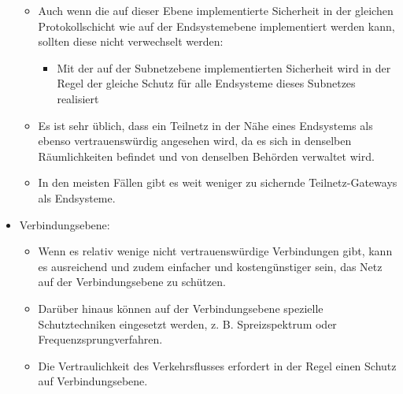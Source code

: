 \documentclass[a4paper]{article}
\begin{document}
\begin{multicols}{3}
\begin{itemize}
              \begin{itemize}
                  \item
                        Auch wenn die auf dieser Ebene implementierte Sicherheit in der
                        gleichen Protokollschicht wie auf der Endsystemebene implementiert
                        werden kann, sollten diese nicht verwechselt werden:

                        \begin{itemize}
                            \item
                                  Mit der auf der Subnetzebene implementierten Sicherheit wird in
                                  der Regel der gleiche Schutz für alle Endsysteme dieses Subnetzes
                                  realisiert
                        \end{itemize}
                  \item
                        Es ist sehr üblich, dass ein Teilnetz in der Nähe eines Endsystems
                        als ebenso vertrauenswürdig angesehen wird, da es sich in denselben
                        Räumlichkeiten befindet und von denselben Behörden verwaltet wird.
                  \item
                        In den meisten Fällen gibt es weit weniger zu sichernde
                        Teilnetz-Gateways als Endsysteme.
              \end{itemize}
        \item
              Verbindungsebene:

              \begin{itemize}
                  \item
                        Wenn es relativ wenige nicht vertrauenswürdige Verbindungen gibt,
                        kann es ausreichend und zudem einfacher und kostengünstiger sein,
                        das Netz auf der Verbindungsebene zu schützen.
                  \item
                        Darüber hinaus können auf der Verbindungsebene spezielle
                        Schutztechniken eingesetzt werden, z. B. Spreizspektrum oder
                        Frequenzsprungverfahren.
                  \item
                        Die Vertraulichkeit des Verkehrsflusses erfordert in der Regel einen
                        Schutz auf Verbindungsebene.
              \end{itemize}
    \end{itemize}



\end{multicols}
\end{document}
